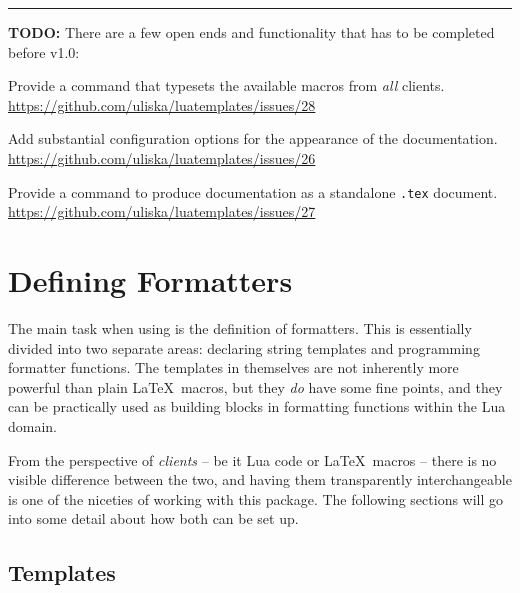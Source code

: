 \documentclass{scrartcl}
\begin{document}
\begin{quote}
\end{quote}

\bigskip

\hrule

\bigskip

\noindent \textbf{TODO:} There are a few open ends and functionality that has to be completed before v1.0:

\begin{itemize*}
\item Provide a command that typesets the available macros from \emph{all} clients.\\
\url{https://github.com/uliska/luatemplates/issues/28}
\item Add substantial configuration options for the appearance of the documentation.\\
\url{https://github.com/uliska/luatemplates/issues/26}
\item Provide a command to produce documentation as a standalone \texttt{.tex} document.\\
\url{https://github.com/uliska/luatemplates/issues/27}
\end{itemize*}


\section{Defining Formatters}
\label{sec:defining-formatters}

The main task when using  is the definition of formatters.
This is essentially divided into two separate areas: declaring string templates
and programming formatter functions.  The templates in themselves are not
inherently more powerful than plain \LaTeX\ macros, but they \emph{do} have
some fine points, and they can be practically used as building blocks in
formatting functions within the Lua domain.

From the perspective of \emph{clients} -- be it Lua code or \LaTeX\ macros --
there is no visible difference between the two, and having them transparently
interchangeable is one of the niceties of working with this package.  The
following sections will go into some detail about how both can be set up.


\subsection{Templates}
\label{sec:templates}
\end{document}
